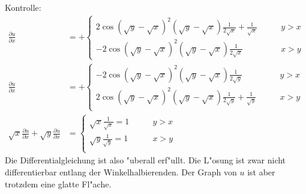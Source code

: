 {\begin{loesung}
Kontrolle:
\begin{align*}
\frac{\partial u}{\partial x}
&=
+\begin{cases}
2\cos(\sqrt{y}-\sqrt{x})^2(\sqrt{y}-\sqrt{x})\frac1{2\sqrt{x}}
+\frac1{\sqrt{x}}&\qquad y> x\\
-2\cos(\sqrt{y}-\sqrt{x})^2(\sqrt{y}-\sqrt{x})\frac1{2\sqrt{x}}
&\qquad x> y
\end{cases}
\\
\frac{\partial u}{\partial x}
&=
+\begin{cases}
-2\cos(\sqrt{y}-\sqrt{x})^2(\sqrt{y}-\sqrt{x})\frac1{2\sqrt{y}}
&\qquad y> x\\
2\cos(\sqrt{y}-\sqrt{x})^2(\sqrt{y}-\sqrt{x})\frac1{2\sqrt{y}}
+\frac1{\sqrt{y}}&\qquad x> y\\
\end{cases}
\\
\sqrt{x}
\frac{\partial u}{\partial x}
+
\sqrt{y}
\frac{\partial u}{\partial x}
&=
\begin{cases}
\sqrt{x}\frac1{\sqrt{x}}=1&\qquad y> x\\
\sqrt{y}\frac1{\sqrt{y}}=1&\qquad x> y\\
\end{cases}
\end{align*}
Die Differentialgleichung ist also "uberall erf"ullt. Die L"osung ist
zwar nicht differentierbar entlang der
Winkelhalbierenden. Der Graph von $u$ ist aber trotzdem eine
glatte Fl"ache.
\end{loesung}
}{}

